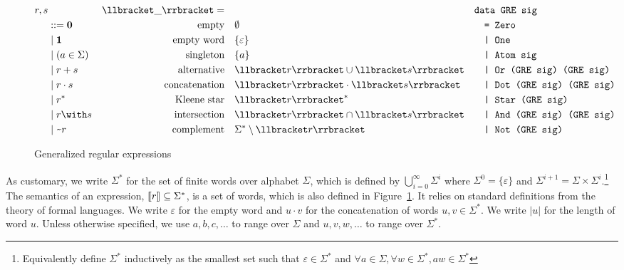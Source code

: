\begin{figure}[tp]
  \begin{align*}
    r, s & &\Lang{\_}=\quad &  &
                             \makebox[1em][l]{\code{data GRE sig}}\\
         & ::= \Rnull & \ltext{empty}
                        & \emptyset
                           &&\code{= Zero}\\
         & \mid \Rempty & \ltext{empty word}
                        & \{ \varepsilon \}
                           && \code{| One}\\
         & \mid (a \in \Sigma) & \ltext{singleton}
                        &  \{ a \}
                           && \code{| Atom sig} \\
         & \mid \Runion rs & \ltext{alternative}
                        &  \Lang{r} \cup \Lang{s}
                           && \code{| Or (GRE sig) (GRE sig)}\\
         & \mid \Rconcat rs & \ltext{concatenation}
                        &  \Lang r \cdot \Lang s
                           && \code{| Dot (GRE sig) (GRE sig)}\\
         & \mid \Rstar r & \ltext{Kleene star}
                        & \Lang r^* 
                           && \code{| Star (GRE sig)}\\
         & \mid \Rintersect rs & \ltext{intersection}
                        & \Lang r \cap \Lang s
                           && \code{| And (GRE sig) (GRE sig)}\\
         & \mid \Rcomplement r & \ltext{complement}
                        & \Sigma^* \setminus \Lang r
                           && \code{| Not (GRE sig)}
  \end{align*}
  \caption{Generalized regular expressions}
  \label{fig:generalized-regular-expressions}
\end{figure}

As customary, we write $\Sigma^*$ for the set of finite words over
alphabet $\Sigma$, which is defined by $\bigcup_{i=0}^\infty \Sigma^i$
where $\Sigma^0 = \{\varepsilon\}$ and $\Sigma^{i+1} = \Sigma \times
\Sigma^i$.\footnote{Equivalently define $\Sigma^*$
inductively as the smallest set such that $\varepsilon \in
\Sigma^*$ and $\forall a\in\Sigma, \forall w\in\Sigma^*, aw \in \Sigma^*$}
The semantics of an expression, $\llbracket r\rrbracket \subseteq \Sigma^*$, is a set of
words, which is also defined in
Figure~\ref{fig:generalized-regular-expressions}. It relies on
standard definitions from the theory of formal languages. We write
$\varepsilon$ for the empty word and $u\cdot v$ for the concatenation
of words $u, v \in \Sigma^*$. We write $|u|$ for the length of word
$u$. Unless otherwise specified, we use $a, b, c, \dots$ to range over
$\Sigma$ and $u, v, w, \dots$ to range over $\Sigma^*$.

